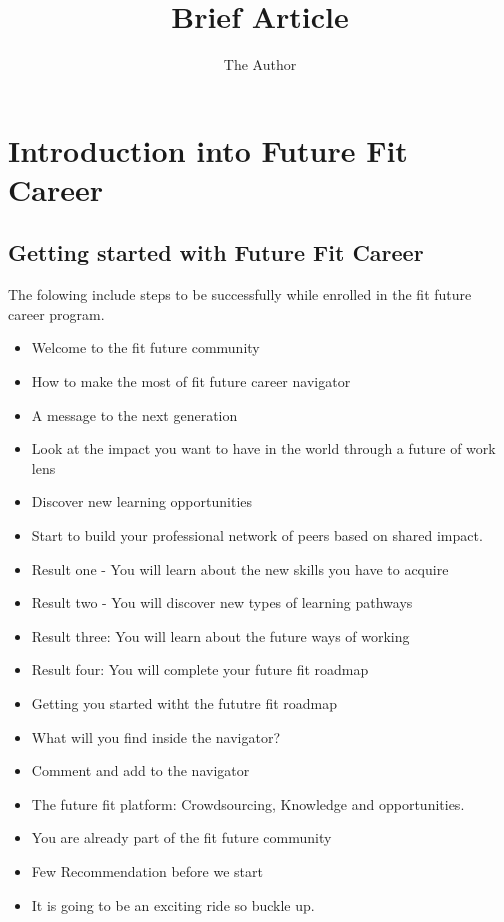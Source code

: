 \documentclass[11pt]{book} %
\title{Brief Article}
\author{The Author}
\begin{document}
\maketitle
\tableofcontents\newpage

\chapter{Introduction into Future Fit Career}
\section{Getting started with Future Fit Career}
	The folowing include steps to be successfully while enrolled in the fit future career program.
	\begin{itemize}
		\item Welcome to the fit future community
		\item How to make the most of fit future career navigator
		\item A message to the next generation
		\item Look at the impact you want to have in the world through a future of work lens
		\item Discover new learning opportunities
		\item Start to build your professional network of peers based on shared impact.
		\item Result one - You will learn about the new skills you have to acquire
		\item Result two - You will discover new types of learning pathways
		\item Result three: You will learn about the future ways of working
		\item Result four: You will complete your future fit roadmap
		\item Getting you started witht the fututre fit roadmap
		\item What will you find inside the navigator?
		\item Comment and add to the navigator
		\item The future fit platform: Crowdsourcing, Knowledge and opportunities.
		\item You are already part of the fit future community
		\item Few Recommendation before we start
		\item It is going to be an exciting ride so buckle up.
	\end{itemize}
\end{document}
